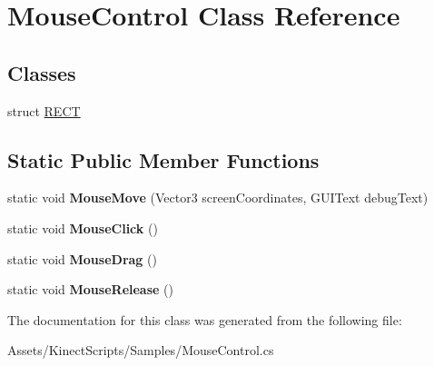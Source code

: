 \hypertarget{class_mouse_control}{}\section{Mouse\+Control Class Reference}
\label{class_mouse_control}
\subsection*{Classes}
\begin{DoxyCompactItemize}
\item 
struct \mbox{\hyperlink{struct_mouse_control_1_1_r_e_c_t}{R\+E\+CT}}
\end{DoxyCompactItemize}
\subsection*{Static Public Member Functions}
\begin{DoxyCompactItemize}
\item 
\mbox{\label{class_mouse_control_a800b976029f4f4999f3814fbc469ce94}} 
static void {\bfseries Mouse\+Move} (Vector3 screen\+Coordinates, G\+U\+I\+Text debug\+Text)
\item 
\mbox{\label{class_mouse_control_afc4eeb0d38965242e550b97774f72cc6}} 
static void {\bfseries Mouse\+Click} ()
\item 
\mbox{\label{class_mouse_control_a7a4998be2c3f73acff61252d972d9f5e}} 
static void {\bfseries Mouse\+Drag} ()
\item 
\mbox{\label{class_mouse_control_ad06284605529610482a31465b2f7f6b7}} 
static void {\bfseries Mouse\+Release} ()
\end{DoxyCompactItemize}


The documentation for this class was generated from the following file\+:\begin{DoxyCompactItemize}
\item 
Assets/\+Kinect\+Scripts/\+Samples/Mouse\+Control.\+cs\end{DoxyCompactItemize}
